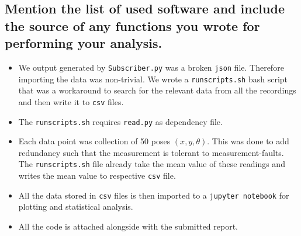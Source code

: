 \subsection{Mention the list of used software and include the source of any functions you wrote for performing your analysis.}
\begin{itemize}
\item We output generated by \texttt{Subscriber.py} was a broken \texttt{json} file. Therefore importing the data was non-trivial. We wrote a \texttt{runscripts.sh} bash script that was a workaround to search for the relevant data from all the recordings and then write it to \texttt{csv} files.
\item The \texttt{runscripts.sh} requires \texttt{read.py} as dependency file.
\item Each data point was collection of 50 poses $(x, y, \theta)$. This was done to add redundancy such that the measurement is tolerant to measurement-faults. The \texttt{runscripts.sh} file already take the mean value of these readings and writes the mean value to respective \texttt{csv} file.
\item All the data stored in \texttt{csv} files is then imported to a \texttt{jupyter notebook} for plotting and statistical analysis.
\item All the code is attached alongside with the submitted report.
\end{itemize}

